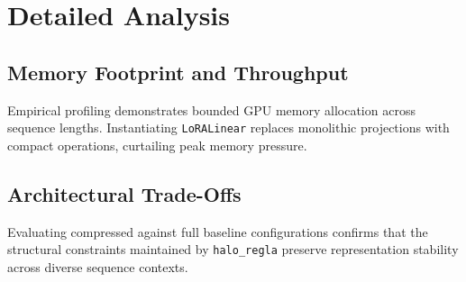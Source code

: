 \section{Detailed Analysis}

\subsection{Memory Footprint and Throughput}
Empirical profiling demonstrates bounded GPU memory allocation across sequence lengths. Instantiating \texttt{LoRALinear} replaces monolithic projections with compact operations, curtailing peak memory pressure.

\subsection{Architectural Trade-Offs}
Evaluating compressed against full baseline configurations confirms that the structural constraints maintained by \texttt{halo_regla} preserve representation stability across diverse sequence contexts.
